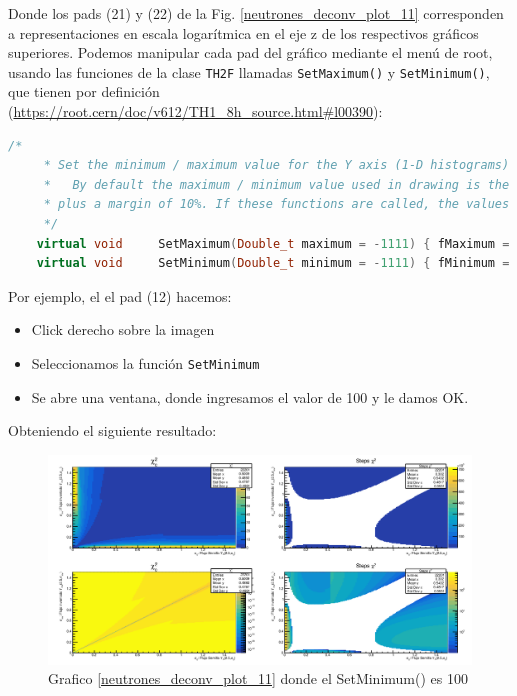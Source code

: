 \documentclass[11pt,letterpaper]{article}
\begin{document}
Donde los pads (21) y (22) de la Fig. \ref{neutrones_deconv_plot_11} corresponden a representaciones en escala logarítmica en el eje z de los respectivos gráficos superiores.
Podemos manipular cada pad del gráfico mediante el menú de root, usando las funciones de la clase \verb|TH2F| llamadas \verb|SetMaximum()| y \verb|SetMinimum()|, que tienen por definición (\url{https://root.cern/doc/v612/TH1_8h_source.html#l00390}):

\begin{lstlisting}[language=c++]
    /*
     * Set the minimum / maximum value for the Y axis (1-D histograms) or Z axis (2-D histograms)
     *   By default the maximum / minimum value used in drawing is the maximum / minimum value of the histogram
     * plus a margin of 10%. If these functions are called, the values are used without any extra margin.
     */
    virtual void     SetMaximum(Double_t maximum = -1111) { fMaximum = maximum; }; // *MENU*
    virtual void     SetMinimum(Double_t minimum = -1111) { fMinimum = minimum; }; // *MENU*
\end{lstlisting}
			
Por ejemplo, el el pad (12) hacemos:

\begin{itemize}
\item Click derecho sobre la imagen
\item Seleccionamos la función \verb|SetMinimum|
\item Se abre una ventana, donde ingresamos el valor de 100 y le damos OK.
\end{itemize}			

Obteniendo el siguiente resultado:

\begin{figure}[H]
    \includegraphics[width=1.\textwidth]{img/chi2_test_1-149_fluxseed_G_fluxinv_G_11_SetMinimum100.png}
    \centering
     \cprotect\caption{Grafico \ref{neutrones_deconv_plot_11} donde el SetMinimum() es 100} 
\label{neutrones_deconv_plot_11_SetMinimum100}
\end{figure}
\end{document}
